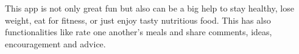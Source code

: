\begin{enumerate}
This app is not only great fun but also can be a big help to stay healthy, lose
weight, eat for fitness, or just enjoy tasty nutritious food. This has also
functionalities like rate one another's meals and share comments, ideas,
encouragement and advice.
\begin{figure}[h!t]
\centering
{}
\end{figure}
\end{enumerate}
